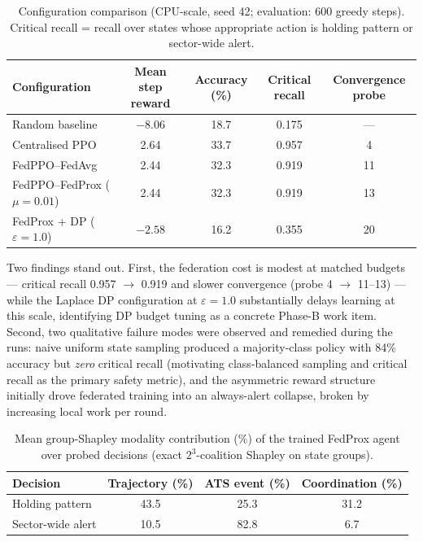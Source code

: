 \documentclass[11pt]{article}
\begin{document}
\begin{table}[ht]\centering\small
\caption{Configuration comparison (CPU-scale, seed 42; evaluation: 600 greedy steps). Critical recall = recall over states whose appropriate action is holding pattern or sector-wide alert.}\label{tab:conf}
\begin{tabular}{lcccc}
\toprule
\textbf{Configuration} & \textbf{Mean step reward} & \textbf{Accuracy (\%)} & \textbf{Critical recall} & \textbf{Convergence probe}\\
\midrule
Random baseline & $-8.06$ & 18.7 & 0.175 & ---\\
Centralised PPO & 2.64 & 33.7 & 0.957 & 4\\
FedPPO--FedAvg & 2.44 & 32.3 & 0.919 & 11\\
FedPPO--FedProx ($\mu=0.01$) & 2.44 & 32.3 & 0.919 & 13\\
FedProx + DP ($\varepsilon=1.0$) & $-2.58$ & 16.2 & 0.355 & 20\\
\bottomrule
\end{tabular}
\end{table}

Two findings stand out. First, the federation cost is modest at matched budgets --- critical recall 0.957 $\rightarrow$ 0.919 and slower convergence (probe 4 $\rightarrow$ 11--13) --- while the Laplace DP configuration at $\varepsilon=1.0$ substantially delays learning at this scale, identifying DP budget tuning as a concrete Phase-B work item. Second, two qualitative failure modes were observed and remedied during the runs: naive uniform state sampling produced a majority-class policy with 84\% accuracy but \emph{zero} critical recall (motivating class-balanced sampling and critical recall as the primary safety metric), and the asymmetric reward structure initially drove federated training into an always-alert collapse, broken by increasing local work per round.

\begin{table}[ht]\centering\small
\caption{Mean group-Shapley modality contribution (\%) of the trained FedProx agent over probed decisions (exact $2^3$-coalition Shapley on state groups).}
\begin{tabular}{lccc}
\toprule
\textbf{Decision} & \textbf{Trajectory (\%)} & \textbf{ATS event (\%)} & \textbf{Coordination (\%)}\\
\midrule
Holding pattern & 43.5 & 25.3 & 31.2\\
Sector-wide alert & 10.5 & 82.8 & 6.7\\
\bottomrule
\end{tabular}
\end{table}
\end{document}
